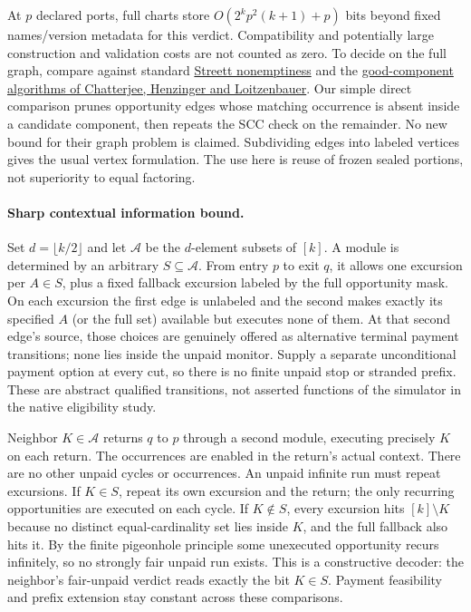 \documentclass{article}
\begin{document}
At \(p\) declared ports, full charts store
\(O(2^k p^2(k+1)+p)\) bits beyond fixed names/version metadata for this
verdict. Compatibility and potentially large construction and validation
costs are not counted as zero. To decide on the full graph, compare
against standard \href{https://hdl.handle.net/1813/7218}{Streett nonemptiness}
and the \href{https://lmcs.episciences.org/3953/pdf}{good-component
algorithms of Chatterjee, Henzinger and Loitzenbauer}. Our simple direct
comparison prunes opportunity edges whose matching occurrence is absent
inside a candidate component, then repeats the SCC check on the remainder.
No new bound for their graph problem is claimed. Subdividing edges into
labeled vertices gives the usual vertex formulation. The use here is
reuse of frozen sealed portions, not superiority to equal factoring.

\paragraph{Sharp contextual information bound.}
Set \(d=\lfloor k/2\rfloor\) and let \(\mathcal A\) be the \(d\)-element
subsets of \([k]\). A module is determined by an arbitrary
\(S\subseteq\mathcal A\). From entry \(p\) to exit \(q\), it allows
one excursion per \(A\in S\), plus a fixed fallback excursion labeled
by the full opportunity mask. On each excursion the first edge is
unlabeled and the second makes exactly its specified \(A\) (or the full
set) available but executes none of them. At that second edge's source,
those choices are genuinely offered as alternative terminal payment
transitions; none lies inside the unpaid monitor. Supply a separate
unconditional payment option at every cut, so there is no finite
unpaid stop or stranded prefix. These are abstract qualified transitions,
not asserted functions of the simulator in the native eligibility study.

Neighbor \(K\in\mathcal A\) returns \(q\) to \(p\) through a second
module, executing precisely \(K\) on each return. The occurrences are
enabled in the return's actual context. There are no other unpaid
cycles or occurrences. An unpaid infinite run must repeat excursions.
If \(K\in S\), repeat its own excursion and the return; the only recurring
opportunities are executed on each cycle. If \(K\notin S\), every
excursion hits \([k]\setminus K\) because no distinct equal-cardinality
set lies inside \(K\), and the full fallback also hits it.
By the finite pigeonhole principle some unexecuted opportunity recurs
infinitely, so no strongly fair unpaid run exists. This is a
constructive decoder: the neighbor's fair-unpaid verdict reads exactly
the bit \(K\in S\). Payment feasibility and prefix extension stay
constant across these comparisons.
\end{document}
